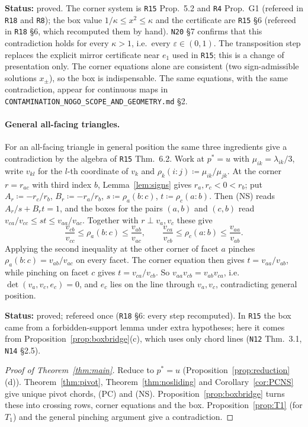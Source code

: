 \documentclass[11pt]{article}
\theoremstyle{definition}
\theoremstyle{remark}
\newcommand{\src}[1]{\texttt{#1}}
\newcommand{\status}[1]{\par\smallskip\noindent\textbf{Status:} #1\par\smallskip}
\begin{document}
\status{proved. The corner system is \src{R15} Prop.~5.2 and \src{R4} Prop.~G1 (refereed in \src{R18} and \src{R8}); the box value $1/\kappa\le x^2\le\kappa$ and the certificate are \src{R15} \S6 (refereed in \src{R18} \S6, which recomputed them by hand). \src{N20} \S7 confirms that this contradiction holds for every $\kappa>1$, i.e.\ every $\varepsilon\in(0,1)$. The transposition step replaces the explicit mirror certificate near $e_1$ used in \src{R15}; this is a change of presentation only. The corner equations alone are consistent (two sign-admissible solutions $x_\pm$), so the box is indispensable. The same equations, with the same contradiction, appear for continuous maps in \src{CONTAMINATION\_NOGO\_SCOPE\_AND\_GEOMETRY.md} \S2.}

\paragraph{General all-facing triangles.}
For an all-facing triangle in general position the same three ingredients give a contradiction by the algebra of \src{R15} Thm.~6.2. Work at $p^*=u$ with $\mu_{ik}=\lambda_{ik}/3$, write $v_{kl}$ for the $l$-th coordinate of $v_k$ and $\rho_k(i{:}j)\coloneqq\mu_{ik}/\mu_{jk}$. At the corner $r=r_{ac}$ with third index $b$, Lemma~\ref{lem:signs} gives $r_a,r_c<0<r_b$; put $A_r\coloneqq-r_c/r_b$, $B_r\coloneqq-r_a/r_b$, $s\coloneqq\rho_a(b{:}c)$, $t\coloneqq\rho_c(a{:}b)$. Then (NS) reads $A_r/s+B_rt=1$, and the boxes for the pairs $(a,b)$ and $(c,b)$ read $v_{ca}/v_{cc}\le st\le v_{aa}/v_{ac}$. Together with $r\perp v_a,v_c$ these give
\[
\frac{v_{cb}}{v_{cc}}\le\rho_a(b{:}c)\le\frac{v_{ab}}{v_{ac}},\qquad\frac{v_{ca}}{v_{cb}}\le\rho_c(a{:}b)\le\frac{v_{aa}}{v_{ab}} .
\]
Applying the second inequality at the other corner of facet $a$ pinches $\rho_a(b{:}c)=v_{ab}/v_{ac}$ on every facet. The corner equation then gives $t=v_{aa}/v_{ab}$, while pinching on facet $c$ gives $t=v_{ca}/v_{cb}$. So $v_{aa}v_{cb}=v_{ab}v_{ca}$, i.e.\ $\det(v_a,v_c,e_c)=0$, and $e_c$ lies on the line through $v_a,v_c$, contradicting general position.
\status{proved; refereed once (\src{R18} \S6: every step recomputed). In \src{R15} the box came from a forbidden-support lemma under extra hypotheses; here it comes from Proposition~\ref{prop:boxbridge}(c), which uses only chord lines (\src{N12} Thm.~3.1, \src{N14} \S2.5).}

\begin{proof}[Proof of Theorem~\ref{thm:main}]
Reduce to $p^*=u$ (Proposition~\ref{prop:reduction}(d)). Theorem~\ref{thm:pivot}, Theorem~\ref{thm:nosliding} and Corollary~\ref{cor:PCNS} give unique pivot chords, (PC) and (NS). Proposition~\ref{prop:boxbridge} turns these into crossing rows, corner equations and the box. Proposition~\ref{prop:T1} (for $T_1$) and the general pinching argument give a contradiction.
\end{proof}
\end{document}
